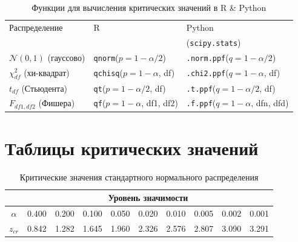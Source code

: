 \documentclass[12pt]{article}
\begin{document}
\begin{table}[h]
\caption{Функции для вычисления критических значений в R \& Python}
\begin{center}
\begin{tabular}{|l|l|l|}\hline
	Распределение & R & Python \\
	& & (\texttt{scipy.stats}) \\
	\hline\hline
	\(\mathcal{N}(0,1)\) (гауссово) & \texttt{qnorm}($p=1-\alpha/2$) & \texttt{.norm.ppf}($q=1-\alpha/2$)\\ \hline
	\(\chi^2_{df}\) (хи-квадрат) & \texttt{qchisq}($p=1-\alpha$, df) & \texttt{.chi2.ppf}($q=1-\alpha$, df) \\ \hline
	\(t_{df}\) (Стьюдента) & \texttt{qt}($p=1-\alpha/2$, df) & \texttt{.t.ppf}($q=1-\alpha/2$, df) \\ \hline
	\(F_{df1,df2}\) (Фишера) & \texttt{qf}($p=1-\alpha$, df1, df2) & \texttt{.f.ppf}($q=1-\alpha$, dfn, dfd) \\
	\hline
\end{tabular}
\end{center}
\end{table}

\newpage

\section{Таблицы критических значений}

\begin{table}[h]
\caption{Критические значения стандартного нормального распределения}
{\small \begin{center}
\begin{tabular}{|c|c|c|c|c|c|c|c|c|c|}
	\hline
	& \multicolumn{9}{c|}{Уровень значимости } \\ \hline
	$\alpha$ &  0.400 &  0.200 &  0.100 &  0.050 &  0.020 &  0.010 & 0.005 &0.002 & 0.001\\ \hline
	$z_{cr}$ &  0.842 &  1.282 &  1.645 &  1.960 & 2.326& 2.576& 2.807& 3.090 & 3.291\\
	\hline
\end{tabular}
\end{center} }
\end{table}

\end{document}

